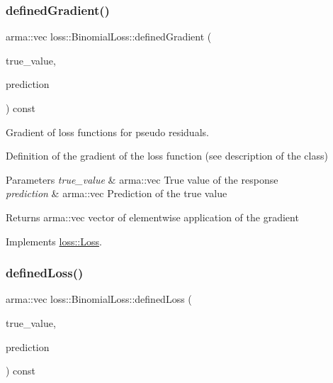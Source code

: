 \mbox{\label{classloss_1_1_binomial_loss_a47a27e1be3e7f2c275046b42557ca21a}} 
\subsubsection{\texorpdfstring{defined\+Gradient()}{definedGradient()}}
{\footnotesize\ttfamily arma\+::vec loss\+::\+Binomial\+Loss\+::defined\+Gradient (\begin{DoxyParamCaption}\item[{const arma\+::vec \&}]{true\+\_\+value,  }\item[{const arma\+::vec \&}]{prediction }\end{DoxyParamCaption}) const\hspace{0.3cm}{\ttfamily [virtual]}}



Gradient of loss functions for pseudo residuals. 

Definition of the gradient of the loss function (see description of the class)


\begin{DoxyParams}{Parameters}
{\em true\+\_\+value} & {\ttfamily arma\+::vec} True value of the response \\
\hline
{\em prediction} & {\ttfamily arma\+::vec} Prediction of the true value\\
\hline
\end{DoxyParams}
\begin{DoxyReturn}{Returns}
{\ttfamily arma\+::vec} vector of elementwise application of the gradient 
\end{DoxyReturn}


Implements \mbox{\hyperlink{classloss_1_1_loss_a267a4de70747ade4b2d84ce35a448979}{loss\+::\+Loss}}.

\mbox{\label{classloss_1_1_binomial_loss_aa4570a731257ba43b1b4d6099c0a4515}} 
\subsubsection{\texorpdfstring{defined\+Loss()}{definedLoss()}}
{\footnotesize\ttfamily arma\+::vec loss\+::\+Binomial\+Loss\+::defined\+Loss (\begin{DoxyParamCaption}\item[{const arma\+::vec \&}]{true\+\_\+value,  }\item[{const arma\+::vec \&}]{prediction }\end{DoxyParamCaption}) const\hspace{0.3cm}{\ttfamily [virtual]}}



